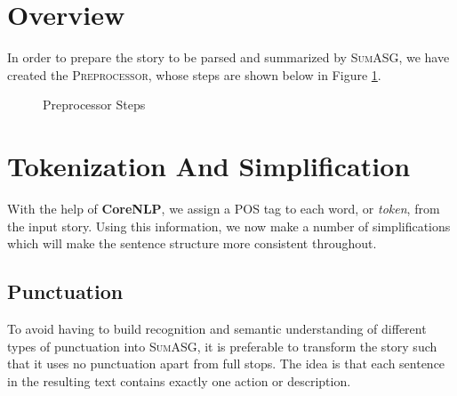 \label{chapter:preprocessor}

\section{Overview}

In order to prepare the story to be parsed and summarized by \textsc{SumASG}, we have created the \textsc{Preprocessor}, whose steps are shown below in Figure \ref{fig:preprocessor_pipeline}.

{
\begin{figure}[H]
\centering
{}
\caption{Preprocessor Steps}
\label{fig:preprocessor_pipeline}
\end{figure}
}

\section{Tokenization And Simplification}
\label{sec:tokenization_scoring}

With the help of \textbf{CoreNLP}, we assign a POS tag to each word, or \textit{token}, from the input story. Using this information, we now make a number of simplifications which will make the sentence structure more consistent throughout.

\subsection{Punctuation}
\label{subsec:punctuation}

To avoid having to build recognition and semantic understanding of different types of punctuation into \textsc{SumASG}, it is preferable to transform the story such that it uses no punctuation apart from full stops. The idea is that each sentence in the resulting text contains exactly one action or description.

